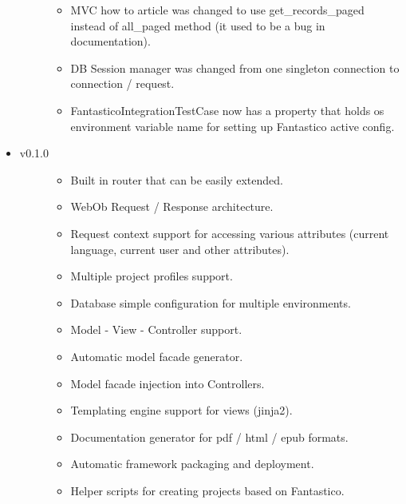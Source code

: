 \documentclass[letterpaper,10pt,english]{sphinxmanual}
\begin{document}
\begin{itemize}
\begin{description}
\begin{itemize}
\item {} 
MVC how to article was changed to use get\_records\_paged instead of all\_paged method (it used to be a bug in documentation).

\item {} 
DB Session manager was changed from one singleton connection to connection / request.

\item {} 
FantasticoIntegrationTestCase now has a property that holds os environment variable name for setting up Fantastico active config.

\end{itemize}

\end{description}

\item {} \begin{description}
\item[{v0.1.0}] \leavevmode\begin{itemize}
\item {} 
Built in router that can be easily extended.

\item {} 
WebOb Request / Response architecture.

\item {} 
Request context support for accessing various attributes (current language, current user and other attributes).

\item {} 
Multiple project profiles support.

\item {} 
Database simple configuration for multiple environments.

\item {} 
Model - View - Controller support.

\item {} 
Automatic model facade generator.

\item {} 
Model facade injection into Controllers.

\item {} 
Templating engine support for views (jinja2).

\item {} 
Documentation generator for pdf / html / epub formats.

\item {} 
Automatic framework packaging and deployment.

\item {} 
Helper scripts for creating projects based on Fantastico.


\end{itemize}
\end{description}
\end{itemize}
\end{document}
